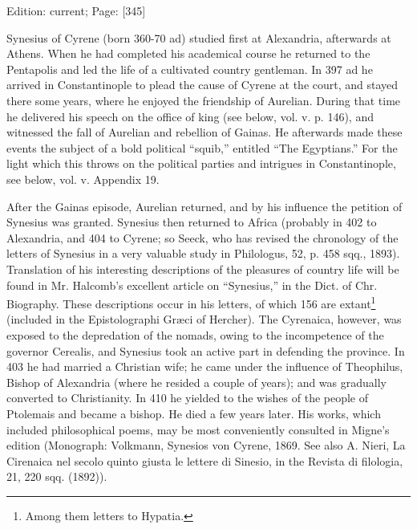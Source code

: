 Edition: current; Page: [345]

Synesius of Cyrene (born 360-70 ad) studied first at Alexandria, afterwards at Athens. When he had completed his academical course he returned to the Pentapolis and led the life of a cultivated country gentleman. In 397 ad he arrived in Constantinople to plead the cause of Cyrene at the court, and stayed there some years, where he enjoyed the friendship of Aurelian. During that time he delivered his speech on the office of king (see below, vol. v. p. 146), and witnessed the fall of Aurelian and rebellion of Gainas. He afterwards made these events the subject of a bold political \texthebrew{“}squib,\texthebrew{}” entitled \texthebrew{“}The Egyptians.\texthebrew{}” For the light which this throws on the political parties and intrigues in Constantinople, see below, vol. v. Appendix 19.

After the Gainas episode, Aurelian returned, and by his influence the petition of Synesius was granted. Synesius then returned to Africa (probably in 402 to Alexandria, and 404 to Cyrene; so Seeck, who has revised the chronology of the letters of Synesius in a very valuable study in Philologus, 52, p. 458 sqq., 1893). Translation of his interesting descriptions of the pleasures of country life will be found in Mr. Halcomb\texthebrew{}’s excellent article on \texthebrew{“}Synesius,\texthebrew{}” in the Dict. of Chr. Biography. These descriptions occur in his letters, of which 156 are extant\footnote{Among them letters to Hypatia.} (included in the Epistolographi Græci of Hercher). The Cyrenaica, however, was exposed to the depredation of the nomads, owing to the incompetence of the governor Cerealis, and Synesius took an active part in defending the province. In 403 he had married a Christian wife; he came under the influence of Theophilus, Bishop of Alexandria (where he resided a couple of years); and was gradually converted to Christianity. In 410 he yielded to the wishes of the people of Ptolemais and became a bishop. He died a few years later. His works, which included philosophical poems, may be most conveniently consulted in Migne\texthebrew{}’s edition (Monograph: Volkmann, Synesios von Cyrene, 1869. See also A. Nieri, La Cirenaica nel secolo quinto giusta le lettere di Sinesio, in the Revista di filologia, 21, 220 sqq. (1892)).

